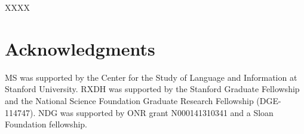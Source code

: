 \documentclass[10pt,letterpaper]{article}
\begin{document}
XXXX

\section{\bf Acknowledgments}
\small
MS was supported by the Center for the Study of Language and Information at Stanford University. RXDH was supported by the Stanford Graduate Fellowship and the National Science Foundation Graduate Research Fellowship (DGE-114747). NDG was supported by ONR grant N000141310341 and a Sloan Foundation fellowship.


\setlength{\bibleftmargin}{.125in}
\setlength{\bibindent}{-\bibleftmargin}


\end{document}
